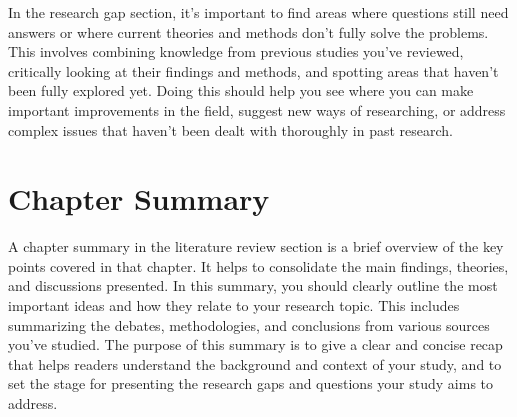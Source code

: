 In the research gap section, it's important to find areas where questions still need answers or where current theories and methods don't fully solve the problems. This involves combining knowledge from previous studies you've reviewed, critically looking at their findings and methods, and spotting areas that haven't been fully explored yet. Doing this should help you see where you can make important improvements in the field, suggest new ways of researching, or address complex issues that haven't been dealt with thoroughly in past research.

\section{Chapter Summary}

A chapter summary in the literature review section is a brief overview of the key points covered in that chapter. It helps to consolidate the main findings, theories, and discussions presented. In this summary, you should clearly outline the most important ideas and how they relate to your research topic. This includes summarizing the debates, methodologies, and conclusions from various sources you've studied. The purpose of this summary is to give a clear and concise recap that helps readers understand the background and context of your study, and to set the stage for presenting the research gaps and questions your study aims to address.

